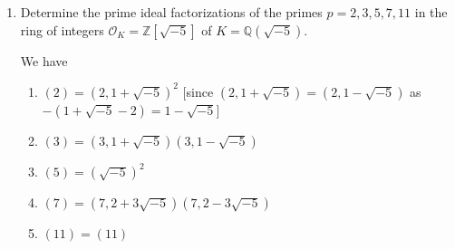 \documentclass[11pt]{article}
\begin{document}
\begin{enumerate}
\begin{enumerate}
\begin{proof}
\begin{enumerate}
\begin{enumerate}
                    \item When $e\geq 2$, by the third isomorphism theorem and the fact that $P^e\subseteq P$ we have that \[\frac{p^2}{\abs{P/P^e}}=\frac{\abs{\mathcal{O}_K/P^e}}{\abs{P/P^e}} = \abs{\mathcal{O}_K/P}.\] As $P$ is a proper ideal we must have that $\abs{\mathcal{O}_K/P}$ is either $p^2$ or $p$, so  $\abs{P/P^e}$ is correspondingly either $1$ or $p$. In the case that  $\abs{P/P^e}=1$ we obtain case A (since $P\cong P^e$). So assume that $\abs{P/P^e}=p$ so that $\abs{\mathcal{O}_K/P}=2$. Then $P/P^e$ is a cyclic group of order $p$. Again use the third isomorphism theorem and note that $P^e\subseteq P^2$ to see that \[\frac{p}{\abs{P^2/P^e}} = \frac{\abs{P/P^e}}{\abs{P^2/P^e}} = \abs{P/P^2}.\] It follows that $\abs{P^2/P^e}$ is either $1$ or $p$, and in the latter case we again obtain case A (as $P\cong P^2$ implies $P\cong P^e$). So if $\abs{P^2/P^e}=1$, we obtain that $P^2\cong P^e$, which implies that $(p) = P^e = P^2$ with $\abs{\mathcal{O}_K/P}=2$, which is the third possibility in the problem statement.
                \end{enumerate}
                \item By reordering suppose that $\abs{\mathcal{O}_K/P_1^{e_1}}=\abs{\mathcal{O}_K/P_2^{e_2}}=p$ so that $\abs{\mathcal{O}_K/P_i^{e_i}}=1$ for $i\geq 3$. This means that in the factorization $(p) = \prod_i P_i^{e_i}$, we only have the terms $P_1^{e_1}$ and $P_2^{e_2}$ occur; that is, $(p)= P_1^{e_1}P_2^{e_2}$. For $i = 1,2$ we have $P_i^{e_i}\subseteq P_i$ so again we have \[\frac{p}{\abs{P_i/P_i^{e_i}}} = \frac{\abs{\mathcal{O}_K/P_i^{e_i}}}{\abs{P_i/P_i^{e_i}}}=\abs{\mathcal{O}_K/P_i},\] from which it similarly follows that $P_i\cong P_i^{e_i}$ so that $(p) = P_1P_2$ with $\abs{\mathcal{O}_K/P_1}=\abs{\mathcal{O}_K/P_2}=p$, the second possibility in the problem statement.
            \end{enumerate}
        \end{proof}
        \item Determine the prime ideal factorizations of the primes $p =2,3,5,7,11$ in the ring of integers $\mathcal{O}_K = \mathbb{Z}[\sqrt{-5}]$ of $K = \mathbb{Q}(\sqrt{-5})$.
        
        We have \begin{enumerate}
            \item $(2) = (2,1+\sqrt{-5})^2$ [since $(2,1+\sqrt{-5}) = (2,1-\sqrt{-5})$ as $-(1+\sqrt{-5}-2)=1-\sqrt{-5}$]
            \item $(3) = (3,1+\sqrt{-5})(3,1-\sqrt{-5})$
            \item $(5)=(\sqrt{-5})^2$
            \item $(7) = (7,2+3\sqrt{-5})(7,2-3\sqrt{-5})$
            \item $(11) = (11)$
        \end{enumerate}
    \end{enumerate}
\end{enumerate}
\end{document}
